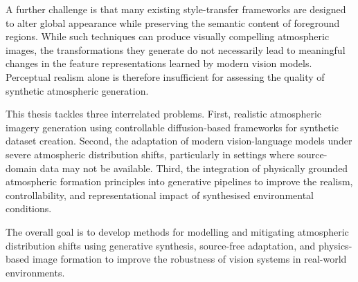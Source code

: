 \noindent A further challenge is that many existing style-transfer frameworks are designed to alter global appearance while preserving the semantic content of foreground regions. While such techniques can produce visually compelling atmospheric images, the transformations they generate do not necessarily lead to meaningful changes in the feature representations learned by modern vision models. Perceptual realism alone is therefore insufficient for assessing the quality of synthetic atmospheric generation.

\noindent This thesis tackles three interrelated problems. First, realistic atmospheric imagery generation using controllable diffusion-based frameworks for synthetic dataset creation. Second, the adaptation of modern vision-language models under severe atmospheric distribution shifts, particularly in settings where source-domain data may not be available. Third, the integration of physically grounded atmospheric formation principles into generative pipelines to improve the realism, controllability, and representational impact of synthesised environmental conditions.

\noindent The overall goal is to develop methods for modelling and mitigating atmospheric distribution shifts using generative synthesis, source-free adaptation, and physics-based image formation to improve the robustness of vision systems in real-world environments.

